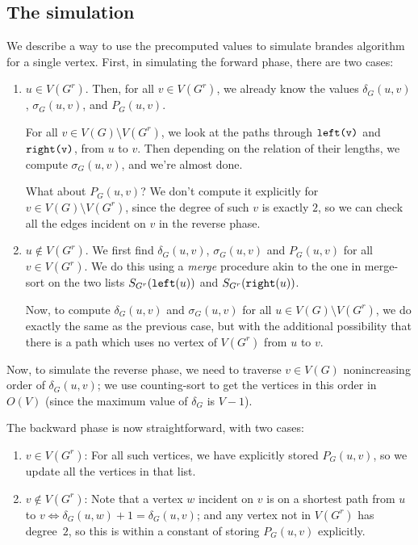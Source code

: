 \subsection{The simulation}
We describe a way to use the precomputed values to simulate brandes
algorithm for a single vertex.
First, in simulating the forward phase, there are two cases:

\begin{enumerate}[I]
	\item
		$u \in V(G^r)$.
		Then, for all $v \in V(G^r)$, we already know the values
		$\delta_G(u, v)$, $\sigma_G(u, v)$, and $P_G(u, v)$.

		For all $v \in V(G) \setminus V(G^r)$, we look at the paths
		through $\texttt{left(v)}$ and $\texttt{right(v)}$, from $u$ to $v$.
		Then depending on the relation of their lengths, we compute
		$\sigma_G(u, v)$, and we're almost done.
		
		What about $P_G(u, v)$? We don't compute it explicitly for
		$v \in V(G) \setminus V(G^r)$, since the degree of such $v$ is
		exactly $2$, so we can check all the edges incident on $v$
		in the reverse phase.
	\item
		$u \notin V(G^r)$.
		We first find $\delta_G(u, v)$, $\sigma_G(u, v)$ and $P_G(u, v)$
		for all $v \in V(G^r)$. We do this using a \emph{merge} procedure
		akin to the one in merge-sort on the two lists
		$S_{G^r}(\texttt{left}(u))$ and $S_{G^r}(\texttt{right}(u))$.

		Now, to compute $\delta_G(u, v)$ and $\sigma_G(u, v)$
		for all $u \in V(G) \setminus V(G^r)$, we do exactly the same as
		the previous case, but with the additional possibility that
		there is a path which uses no vertex of $V(G^r)$ from $u$ to $v$.
\end{enumerate}

Now, to simulate the reverse phase, we need to traverse $v\in V(G)$
nonincreasing order of $\delta_G(u, v)$; we use counting-sort to get
the vertices in this order in $O(V)$
(since the maximum value of $\delta_G$ is $V - 1$).

The backward phase is now straightforward, with two cases:
\begin{enumerate}
	\item
		$v \in V(G^r)$: For all such vertices, we have explicitly stored
		$P_G(u, v)$, so we update all the vertices in that list.
	\item
		$v \notin V(G^r)$: Note that a vertex $w$ incident on $v$ is on a
		shortest path from $u$ to $v \iff \delta_G(u, w) + 1 = \delta_G(u, v)$;
		and any vertex not in $V(G^r)$ has degree~$2$, so this is within
		a constant of storing $P_G(u, v)$ explicitly.
\end{enumerate}
